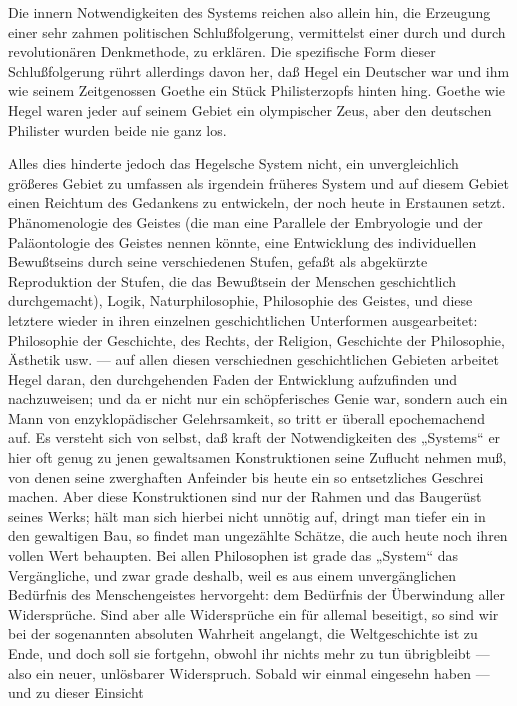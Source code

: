 Die innern Notwendigkeiten des Systems reichen also allein hin,
die Erzeugung einer sehr zahmen politischen Schlußfolgerung, vermittelst
einer durch und durch revolutionären Denkmethode, zu erklären. Die
spezifische Form dieser Schlußfolgerung rührt allerdings davon her, daß
Hegel ein Deutscher war und ihm wie seinem Zeitgenossen Goethe ein Stück
Philisterzopfs hinten hing. Goethe wie Hegel waren jeder auf seinem
Gebiet ein olympischer Zeus, aber den deutschen Philister wurden beide
nie ganz los.

Alles dies hinderte jedoch das Hegelsche System nicht, ein
unvergleichlich größeres Gebiet zu umfassen als irgendein früheres
System und auf diesem Gebiet einen Reichtum des Gedankens zu entwickeln,
der noch heute in Erstaunen setzt. Phänomenologie des Geistes (die man
eine Parallele der Embryologie und der Paläontologie des Geistes nennen
könnte, eine Entwicklung des individuellen Bewußtseins durch seine
verschiedenen Stufen, gefaßt als abgekürzte Reproduktion der Stufen, die
das Bewußtsein der Menschen geschichtlich durchgemacht), Logik,
Naturphilosophie, Philosophie des Geistes, und diese letztere wieder in
ihren einzelnen geschichtlichen Unterformen ausgearbeitet: Philosophie
der Geschichte, des Rechts, der Religion, Geschichte der Philosophie,
Ästhetik usw. --- auf allen diesen verschiednen geschichtlichen Gebieten
arbeitet Hegel daran, den durchgehenden Faden der Entwicklung
aufzufinden und nachzuweisen; und da er nicht nur ein schöpferisches
Genie war, sondern auch ein Mann von enzyklopädischer Gelehrsamkeit, so
tritt er überall epochemachend auf. Es versteht sich von selbst, daß
kraft der Notwendigkeiten des „Systems`` er hier oft genug zu jenen
gewaltsamen Konstruktionen seine Zuflucht nehmen muß, von denen seine
zwerghaften Anfeinder bis heute ein so entsetzliches Geschrei machen.
Aber diese Konstruktionen sind nur der Rahmen und das Baugerüst seines
Werks; hält man sich hierbei nicht unnötig auf, dringt man tiefer ein in
den gewaltigen Bau, so findet man ungezählte Schätze, die auch heute
noch ihren vollen Wert behaupten. Bei allen Philosophen ist grade das
„System`` das Vergängliche, und zwar grade deshalb, weil es aus einem
unvergänglichen Bedürfnis des Menschengeistes hervorgeht: dem Bedürfnis
der Überwindung aller Widersprüche. Sind aber alle Widersprüche ein für
allemal beseitigt, so sind wir bei der sogenannten absoluten Wahrheit
angelangt, die Weltgeschichte ist zu Ende, und doch soll sie fortgehn,
obwohl ihr nichts mehr zu tun übrigbleibt --- also ein neuer, unlösbarer
Widerspruch. Sobald wir einmal eingesehn haben --- und zu dieser Einsicht
